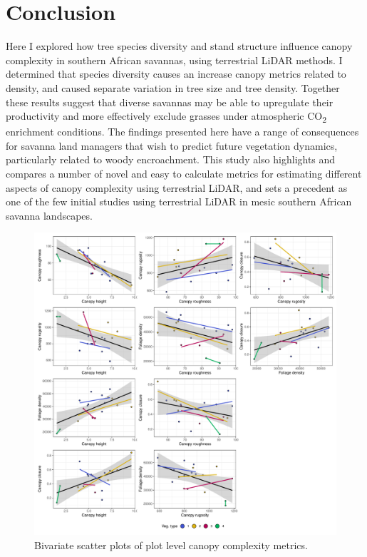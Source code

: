 \documentclass[11pt,a4paper]{article}
\begin{document}
\section{Conclusion}

Here I explored how tree species diversity and stand structure influence canopy complexity in southern African savannas, using terrestrial LiDAR methods. I determined that species diversity causes an increase canopy metrics related to density, and caused separate variation in tree size and tree density. Together these results suggest that diverse savannas may be able to upregulate their productivity and more effectively exclude grasses under atmospheric CO\textsubscript{2} enrichment conditions. The findings presented here have a range of consequences for savanna land managers that wish to predict future vegetation dynamics, particularly related to woody encroachment. This study also highlights and compares a number of novel and easy to calculate metrics for estimating different aspects of canopy complexity using terrestrial LiDAR, and sets a precedent as one of the few initial studies using terrestrial LiDAR in mesic southern African savanna landscapes.

\printbibliography


\begin{figure}
	\includegraphics[width=\linewidth]{canopy_metric_comp_plot}
	\caption{Bivariate scatter plots of plot level canopy complexity metrics.}
	\label{canopy_metric_comp_plot}
\end{figure}
\end{document}
